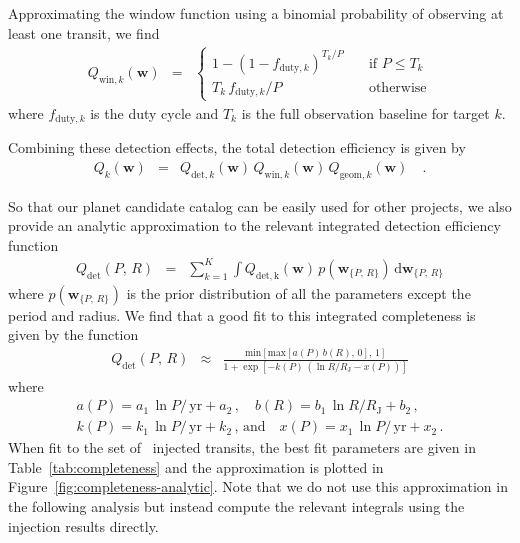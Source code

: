 \documentclass[manuscript, letterpaper]{aastex6}
\newcommand{\dfmfigref}[1]{\ref{fig:#1}}
\newcommand{\dfmFig}[1]{Figure~\dfmfigref{#1}}
\newcommand{\dfmfig}[1]{\dfmFig{#1}}
\newcommand{\dd}{\ensuremath{\,\mathrm{d}}}
\newcommand{\unit}[1]{{\ensuremath{\,\mathrm{#1}}}}
\newcommand{\bvec}[1]{{\ensuremath{\boldsymbol{#1}}}}
\newcommand{\params}{{\ensuremath{\bvec{w}}}}
\begin{document}
Approximating the window function using a binomial probability of observing
at least one transit, we find \citep[following][]{Burke:2014a}
\begin{eqnarray}
Q_{\mathrm{win},k} (\params) &=& \left\{\begin{array}{ll}
1 - (1 - f_{\mathrm{duty},k})^{T_k/P} & \quad\mbox{if $P \le T_k$} \\
T_k\,f_{\mathrm{duty},k} / P & \quad\mbox{otherwise}
\end{array}\right.
\end{eqnarray}
where $f_{\mathrm{duty},k}$ is the duty cycle and $T_k$ is the full
observation baseline for target $k$.

Combining these detection effects, the total detection efficiency is given by
\begin{eqnarray}
Q_k(\params) &=& Q_{\mathrm{det},k}(\params) \,
                 Q_{\mathrm{win},k} (\params) \,
                 Q_{\mathrm{geom},k} (\params) \quad.
\end{eqnarray}

So that our planet candidate catalog can be easily used for other projects, we
also provide an analytic approximation to the relevant integrated detection
efficiency function
\begin{eqnarray}
Q_\mathrm{det}(P,\,R) &=& \sum_{k=1}^{K} \int Q_\mathrm{det,k}(\params)\,
    p(\params_{\{P,\,R\}}) \dd\params_{\{P,\,R\}}
\end{eqnarray}
where $p(\params_{\{P,\,R\}})$ is the prior distribution of all the parameters
except the period and radius.
We find that a good fit to this integrated completeness is given by the
function
\begin{eqnarray}
Q_\mathrm{det}(P,\,R) &\approx&
    \frac{\mathrm{min}[\mathrm{max}[a(P)\,b(R),\,0],\,1]}
         {1+\exp\left[-k(P)\,(\ln R / R_\mathrm{J}-x(P))\right]}
\end{eqnarray}
where
\begin{eqnarray}
a(P) = a_1\,\ln P / \unit{yr} + a_2 \,,\quad
b(R) = b_1\,\ln R / R_\mathrm{J} + b_2 \,,\quad \\
k(P) = k_1\,\ln P / \unit{yr} + k_2 \,,\,\mathrm{and}\quad
x(P) = x_1\,\ln P / \unit{yr} + x_2 \,.
\end{eqnarray}
When fit to the set of \numinjs\ injected transits, the best fit parameters
are given in Table~\ref{tab:completeness} and the approximation is plotted
in \dfmfig{completeness-analytic}.
Note that we do not use this approximation in the following analysis but
instead compute the relevant integrals using the injection results directly.
\end{document}
